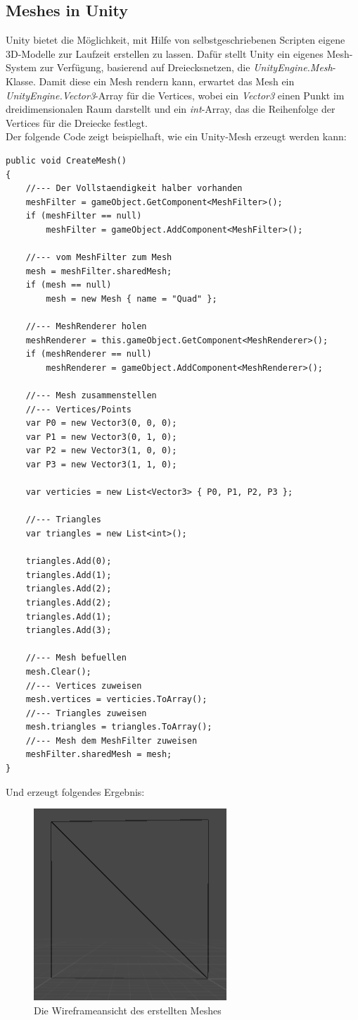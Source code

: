 \subsection{Meshes in Unity}
Unity bietet die M\"oglichkeit, mit Hilfe von selbstgeschriebenen Scripten eigene 3D-Modelle zur Laufzeit erstellen zu lassen. Daf\"ur stellt Unity ein eigenes Mesh-System zur Verf\"ugung, basierend auf Dreiecksnetzen, die \textit{UnityEngine.Mesh}-Klasse. Damit diese ein Mesh rendern kann, erwartet das Mesh ein \textit{UnityEngine.Vector3}-Array f\"ur die Vertices, wobei ein \textit{Vector3} einen Punkt im dreidimensionalen Raum darstellt und ein \textit{int}-Array, das die Reihenfolge der Vertices f\"ur die Dreiecke festlegt.   
\\
Der folgende Code zeigt beispielhaft, wie ein Unity-Mesh erzeugt werden kann:
\begin{lstlisting}
public void CreateMesh()
{
	//--- Der Vollstaendigkeit halber vorhanden
	meshFilter = gameObject.GetComponent<MeshFilter>();
	if (meshFilter == null)
		meshFilter = gameObject.AddComponent<MeshFilter>();

	//--- vom MeshFilter zum Mesh
	mesh = meshFilter.sharedMesh;
	if (mesh == null)
		mesh = new Mesh { name = "Quad" };

	//--- MeshRenderer holen
	meshRenderer = this.gameObject.GetComponent<MeshRenderer>();
	if (meshRenderer == null)
		meshRenderer = gameObject.AddComponent<MeshRenderer>();

	//--- Mesh zusammenstellen
	//--- Vertices/Points
	var P0 = new Vector3(0, 0, 0);
	var P1 = new Vector3(0, 1, 0);
	var P2 = new Vector3(1, 0, 0);
	var P3 = new Vector3(1, 1, 0);
	
	var verticies = new List<Vector3> { P0, P1, P2, P3 };

	//--- Triangles
	var triangles = new List<int>();

	triangles.Add(0);
	triangles.Add(1);
	triangles.Add(2);
	triangles.Add(2);
	triangles.Add(1);
	triangles.Add(3);

	//--- Mesh befuellen
	mesh.Clear();
	//--- Vertices zuweisen
	mesh.vertices = verticies.ToArray();
	//--- Triangles zuweisen
	mesh.triangles = triangles.ToArray();
	//--- Mesh dem MeshFilter zuweisen
	meshFilter.sharedMesh = mesh;
}
\end{lstlisting}

Und erzeugt folgendes Ergebnis:
\begin{figure}[h]
	\centering
	\includegraphics[width=0.35\linewidth]{Images/UnityQuadWireframe}
	\caption[Die Wireframeansicht des erstellten Meshes]{Die Wireframeansicht des erstellten Meshes}
	\label{fig:unityquadwireframe}
\end{figure}


